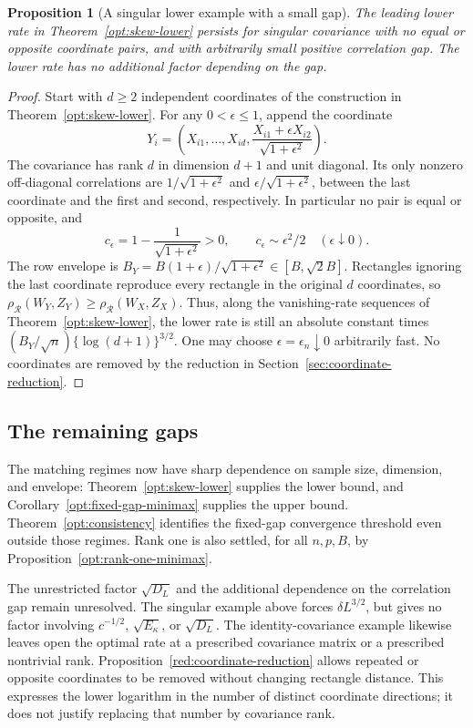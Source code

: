 \documentclass[11pt,a4paper]{article}
\newtheorem{proposition}{Proposition}
\theoremstyle{remark}
\newcommand{\rh}{\rho_{\mathcal R}}
\begin{document}
\begin{proposition}[A singular lower example with a small gap]
\label{opt:singular-embedding}
The leading lower rate in Theorem~\ref{opt:skew-lower} persists for
singular covariance with no equal or opposite coordinate pairs, and
with arbitrarily small positive correlation gap. The lower rate has no
additional factor depending on the gap.
\end{proposition}

\begin{proof}
Start with \(d\ge2\) independent coordinates of the construction in
Theorem~\ref{opt:skew-lower}. For any \(0<\epsilon\le1\), append the
coordinate
\[
 Y_i=\left(X_{i1},\ldots,X_{id},
       \frac{X_{i1}+\epsilon X_{i2}}{\sqrt{1+\epsilon^2}}\right).
\]
The covariance has rank \(d\) in dimension \(d+1\) and unit diagonal.
Its only nonzero off-diagonal correlations are
\(1/\sqrt{1+\epsilon^2}\) and
\(\epsilon/\sqrt{1+\epsilon^2}\), between the last coordinate and
the first and second, respectively. In particular no pair is equal or
opposite, and
\[
 c_\epsilon=1-\frac1{\sqrt{1+\epsilon^2}}>0,
 \qquad c_\epsilon\sim\epsilon^2/2\quad(\epsilon\downarrow0).
\]
The row envelope is
\(B_Y=B(1+\epsilon)/\sqrt{1+\epsilon^2}\in[B,\sqrt2B]\).
Rectangles ignoring the last coordinate reproduce every rectangle in
the original \(d\) coordinates, so
\(\rh(W_Y,Z_Y)\ge\rh(W_X,Z_X)\). Thus, along the vanishing-rate
sequences of Theorem~\ref{opt:skew-lower}, the lower rate is still an
absolute constant times
\((B_Y/\sqrt n)\{\log(d+1)\}^{3/2}\). One may choose
\(\epsilon=\epsilon_n\downarrow0\) arbitrarily fast. No coordinates
are removed by the reduction in Section~\ref{sec:coordinate-reduction}.
\end{proof}

\subsection{The remaining gaps}
\label{opt:remaining}

The matching regimes now have sharp dependence on sample size,
dimension, and envelope: Theorem~\ref{opt:skew-lower} supplies the
lower bound, and Corollary~\ref{opt:fixed-gap-minimax} supplies the upper
bound. Theorem~\ref{opt:consistency} identifies the fixed-gap convergence
threshold even outside those regimes. Rank one is also settled, for
all \(n,p,B\), by Proposition~\ref{opt:rank-one-minimax}.

The unrestricted factor \(\sqrt{D_L}\) and the additional dependence
on the correlation gap remain unresolved. The singular example above
forces \(\delta L^{3/2}\), but gives no factor involving
\(c^{-1/2}\), \(\sqrt{E_\kappa}\), or \(\sqrt{D_L}\). The
identity-covariance example likewise leaves open the optimal rate at a
prescribed covariance matrix or a prescribed nontrivial rank.
Proposition~\ref{red:coordinate-reduction} allows repeated or opposite
coordinates to be removed without changing rectangle distance.
This expresses the lower logarithm in the number of distinct coordinate
directions; it does not justify replacing that number by covariance
rank.
\end{document}
